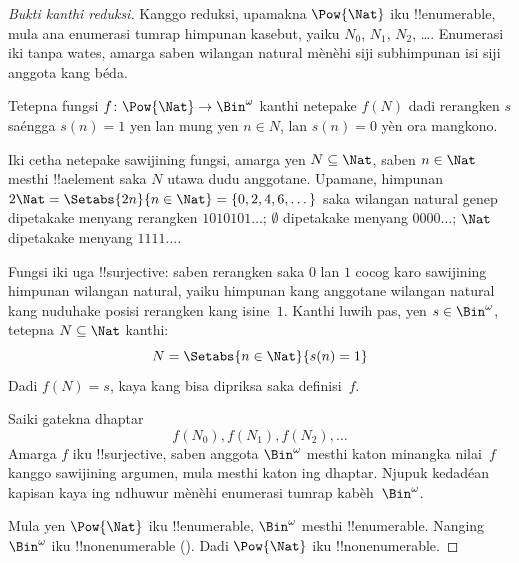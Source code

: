 \documentclass[../../../include/open-logic-section]{subfiles}
\begin{document}
\begin{proof}[Bukti {} kanthi reduksi]
Kanggo reduksi, upamakna $\Pow{\Nat}$ iku !!{enumerable}, mula
ana enumerasi tumrap himpunan kasebut, yaiku $N_{0}$, $N_{1}$, $N_{2}$, \dots.
Enumerasi iki tanpa wates, amarga saben wilangan natural mènèhi
siji subhimpunan isi siji anggota kang béda.

Tetepna fungsi $f \colon \Pow{\Nat} \to \Bin^\omega$ kanthi netepake
$f(N)$ dadi rerangken $s$ saéngga $s(n) = 1$ yen lan mung yen $n \in N$,
lan $s(n) = 0$ yèn ora mangkono.

Iki cetha netepake sawijining fungsi, amarga yen $N \subseteq \Nat$,
saben $n \in \Nat$ mesthi !!a{element} saka $N$ utawa dudu anggotane.
Upamane, himpunan $2\Nat = \Setabs{2n}{n \in \Nat} = \{0,2, 4, 6,
\dots\}$ saka wilangan natural genep dipetakake menyang rerangken $1010101\dots$;
$\emptyset$ dipetakake menyang $0000\dots$; $\Nat$ dipetakake menyang
$1111\dots$.

Fungsi iki uga !!{surjective}: saben rerangken saka $0$ lan $1$ cocog
karo sawijining himpunan wilangan natural, yaiku himpunan kang
anggotane wilangan natural kang nuduhake posisi rerangken kang isine~$1$.
Kanthi luwih pas, yen $s \in \Bin^\omega$, tetepna $N
\subseteq \Nat$ kanthi:
\[
N = \Setabs{n \in \Nat}{s(n) = 1}
\]
Dadi $f(N) = s$, kaya kang bisa dipriksa saka definisi~$f$.

Saiki gatekna dhaptar
\[
f(N_0), f(N_1), f(N_2), \dots
\]
Amarga $f$ iku !!{surjective}, saben anggota $\Bin^\omega$ mesthi
katon minangka nilai~$f$ kanggo sawijining argumen, mula mesthi
katon ing dhaptar. Njupuk kedadéan kapisan kaya ing ndhuwur
mènèhi enumerasi tumrap kabèh~$\Bin^\omega$.

Mula yen $\Pow{\Nat}$ iku !!{enumerable}, $\Bin^\omega$ mesthi
!!{enumerable}. Nanging $\Bin^\omega$ iku !!{nonenumerable}
(). Dadi $\Pow{\Nat}$ iku
!!{nonenumerable}.
\end{proof}

\end{document}
